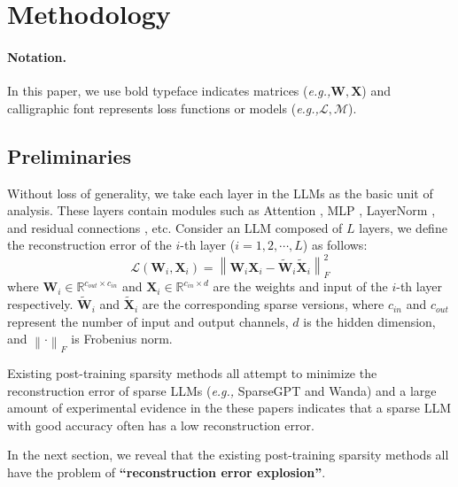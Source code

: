 \section{Methodology}
\paragraph{Notation.} In this paper, we use bold typeface indicates  matrices (\emph{e.g.,}$\boldsymbol{W, X}$) and calligraphic font represents loss functions or models (\emph{e.g.,}$\mathcal{L}, \mathcal{M}$). 

\subsection{Preliminaries}
Without loss of generality, we take each layer in the LLMs as the basic unit of analysis. These layers contain modules such as Attention \citep{vaswani2017attention}, MLP \citep{popescu2009multilayer}, LayerNorm \citep{lei2016layer}, and residual connections \citep{he2016deep}, etc. Consider an LLM composed of $L$ layers, we define the reconstruction error of the $i$-th layer ($i = 1, 2, \cdots, L$) as follows:
\begin{equation}
    \mathcal{L}(\boldsymbol{W}_i, \boldsymbol{X}_i) = \left\lVert \boldsymbol{W}_i\boldsymbol{X}_i - \widetilde{\boldsymbol{W}}_{i}\widetilde{\boldsymbol{X}}_{i}\right\rVert^2_F
\end{equation}
where \(\boldsymbol{W}_i \in \mathbb{R}^{c_{out}\times c_{in}}\) and \(\boldsymbol{X}_i \in \mathbb{R}^{c_{in}\times d}\) are the weights and input of the $i$-th layer respectively. \(\widetilde{\boldsymbol{W}}_{i}\) and \(\widetilde{\boldsymbol{X}}_{i}\) are the corresponding sparse versions, where \(c_{in}\) and \(c_{out}\) represent the number of input and output channels, \(d\) is the hidden dimension, and \(\left\lVert \cdot \right\rVert_F\) is Frobenius norm. 

Existing post-training sparsity methods all attempt to minimize the reconstruction error of sparse LLMs (\emph{e.g.,} SparseGPT and Wanda) and a large amount of experimental evidence in the these papers indicates that a sparse LLM with good accuracy often has a low reconstruction error. 

In the next section, we reveal that the existing post-training sparsity methods all have the problem of \textbf{``reconstruction error explosion''}.
